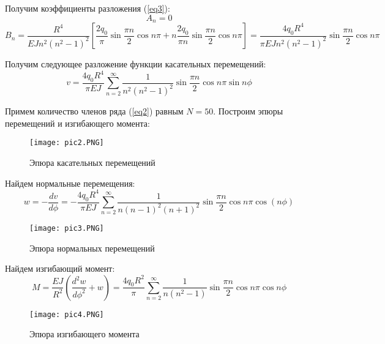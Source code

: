 Получим коэффициенты разложения (\ref{eq3}):
\begin{equation}
    \label{eq12.6}
    A_n = 0
\end{equation}
\begin{equation}
    \label{eq12.7}
    B_n = \frac{R^4}{EJn^2(n^2 - 1)^2} \left[ \frac{2q_0}{\pi} \sin \frac{\pi n}{2} \cos n\pi + n \frac{2q_0}{\pi n} \sin \frac{\pi n}{2} \cos n\pi \right] = \frac{4q_0R^4}{\pi EJn^2(n^2 - 1)^2} \sin \frac{\pi n}{2} \cos n\pi
\end{equation}

Получим следующее разложение функции касательных перемещений:
\begin{equation}
    \label{eq12.8}
    v = \frac{4q_0R^4}{\pi EJ} \sum_{n=2}^{\infty} \frac{1}{n^2(n^2 - 1)^2} \sin \frac{\pi n}{2} \cos n\pi \sin n\phi
\end{equation}

Примем количество членов ряда (\ref{eq2}) равным $N = 50$. Построим эпюры перемещений и изгибающего момента:
\begin{figure}[H]
    \begin{center}
        \texttt{[image: pic2.PNG]}
        \caption{Эпюра касательных перемещений}
        \label{pic2}
    \end{center}
\end{figure}

Найдем нормальные перемещения:
\begin{equation}
    \label{eq13}
    w = - \frac{dv}{d\phi} = - \frac{4q_0R^4}{\pi EJ} \sum_{n=2}^{\infty} \frac{1}{n(n - 1)^2(n + 1)^2} \sin \frac{\pi n}{2} \cos n\pi \cos(n \phi)
\end{equation}

\begin{figure}[H]
    \begin{center}
        \texttt{[image: pic3.PNG]}
        \caption{Эпюра нормальных перемещений}
        \label{pic3}
    \end{center}    
\end{figure}

Найдем изгибающий момент:
\begin{equation}
    \label{eq14}
    M = \frac{EJ}{R^2} \left(\frac{d^2 w}{d \phi^2} + w \right) = \frac{4q_0R^2}{\pi} \sum_{n=2}^{\infty} \frac{1}{n(n^2 - 1)} \sin \frac{\pi n}{2} \cos n\pi \cos n\phi
\end{equation}

\begin{figure}[H]
    \begin{center}
        \texttt{[image: pic4.PNG]}
        \caption{Эпюра изгибающего момента}
        \label{pic4}
    \end{center}
\end{figure}

